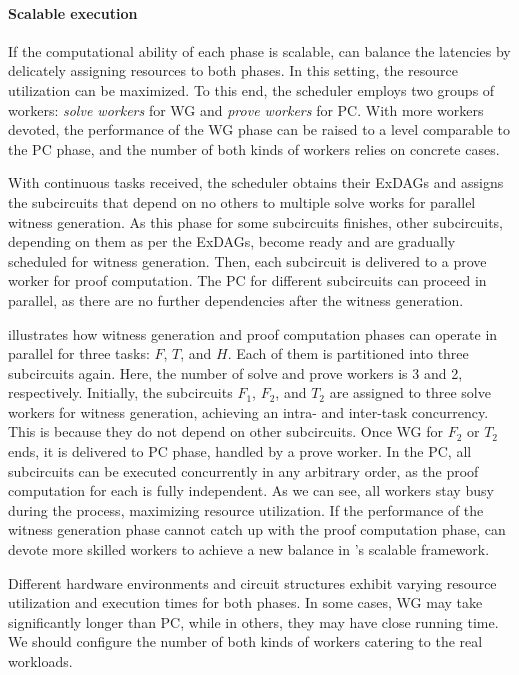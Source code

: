  
\paragraph{Scalable execution} If the computational ability of each phase is scalable, \system can balance the latencies by delicately assigning resources to both phases. In this setting, the resource utilization can be maximized. To this end, the scheduler employs two groups of workers: \emph{solve workers} for WG and \emph{prove workers} for PC. With more workers devoted, the performance of the WG phase can be raised to a level comparable to the PC phase, and the number of both kinds of workers relies on concrete cases. 

With continuous tasks received, the scheduler obtains their ExDAGs and assigns the subcircuits that depend on no others to multiple solve works for parallel witness generation. As this phase for some subcircuits finishes, other subcircuits, depending on them as per the ExDAGs, become ready and are gradually scheduled for witness generation. Then, each subcircuit is delivered to a prove worker for proof computation. The PC for different subcircuits can proceed in parallel, as there are no further dependencies after the witness generation.


\begin{example}   
 illustrates how witness generation and proof computation phases can operate in parallel for three tasks: $F$, $T$, and $H$. Each of them is partitioned into three subcircuits again. Here, the number of solve and prove workers is 3 and 2, respectively.  Initially, the subcircuits $F_1$, $F_2$, and $T_2$ are assigned to three solve workers for witness generation, achieving an intra- and inter-task concurrency. This is because they do not depend on other subcircuits. 
Once WG for $F_2$ or $T_2$ ends, it is delivered to PC phase, handled by a prove worker. In the PC, all subcircuits can be executed concurrently in any arbitrary order, as the proof computation for each is fully independent. As we can see, all workers stay busy during the process, maximizing resource utilization. If the performance of the witness generation phase cannot catch up with the proof computation phase, \system can devote more skilled workers to achieve a new balance in \system's scalable framework.
\end{example}



Different hardware environments and circuit structures exhibit varying resource utilization and execution times for both phases. In some cases, WG may take significantly longer than PC, while in others, they may have close running time.   We should configure the number of both kinds of workers catering to the real workloads.  


















